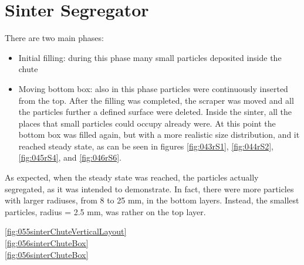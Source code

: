 
\chapter{Sinter Segregator}
\label{cap:sintersegregator}

There are two main phases:
\begin{itemize}
  \item{Initial filling: during this phase many small particles deposited inside
  the chute}
  \item{Moving bottom box: also in this phase particles were
continuously inserted from the top. After the filling was completed, the
scraper was moved and all the particles further a defined surface were
deleted. Inside the sinter, all the places that small particles could
occupy already were. At this point the bottom box was filled again, but
with a more realistic size distribution, and it reached steady state, as can
be seen in figures \ref{fig:043rS1}, \ref{fig:044rS2}, \ref{fig:045rS4}, and
\ref{fig:046rS6}.}
\end{itemize}
As expected, when the steady state was reached, the particles actually
segregated, as it was intended to demonstrate.
In fact, there were more particles with larger radiuses, from 8 to 25 mm, in the
bottom layers.
Instead, the smallest particles, radius = 2.5 mm, was rather on the top layer. 




\ref{fig:055sinterChuteVerticalLayout} \\


\ref{fig:056sinterChuteBox} \\



\ref{fig:056sinterChuteBox}